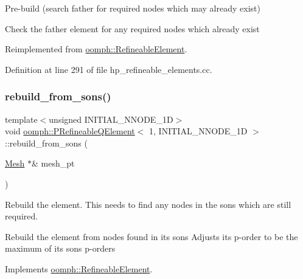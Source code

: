 Pre-\/build (search father for required nodes which may already exist) 

Check the father element for any required nodes which already exist 

Reimplemented from \hyperlink{classoomph_1_1RefineableElement_ab30d66018b994b03731e2942f6a15f36}{oomph\+::\+Refineable\+Element}.



Definition at line 291 of file hp\+\_\+refineable\+\_\+elements.\+cc.

\mbox{\label{classoomph_1_1PRefineableQElement_3_011_00_01INITIAL__NNODE__1D_01_4_a6c2918a2f7a1aa009ae2378132cea6f1}} 
\subsubsection{\texorpdfstring{rebuild\+\_\+from\+\_\+sons()}{rebuild\_from\_sons()}}
{\footnotesize\ttfamily template$<$unsigned I\+N\+I\+T\+I\+A\+L\+\_\+\+N\+N\+O\+D\+E\+\_\+1D$>$ \\
void \hyperlink{classoomph_1_1PRefineableQElement}{oomph\+::\+P\+Refineable\+Q\+Element}$<$ 1, I\+N\+I\+T\+I\+A\+L\+\_\+\+N\+N\+O\+D\+E\+\_\+1D $>$\+::rebuild\+\_\+from\+\_\+sons (\begin{DoxyParamCaption}\item[{\hyperlink{classoomph_1_1Mesh}{Mesh} $\ast$\&}]{mesh\+\_\+pt }\end{DoxyParamCaption})\hspace{0.3cm}{\ttfamily [virtual]}}

Rebuild the element. This needs to find any nodes in the sons which are still required.

Rebuild the element from nodes found in its sons Adjusts its p-\/order to be the maximum of its sons\textquotesingle{} p-\/orders 

Implements \hyperlink{classoomph_1_1RefineableElement_a33324be27833fa4b78279d17158215fa}{oomph\+::\+Refineable\+Element}.



